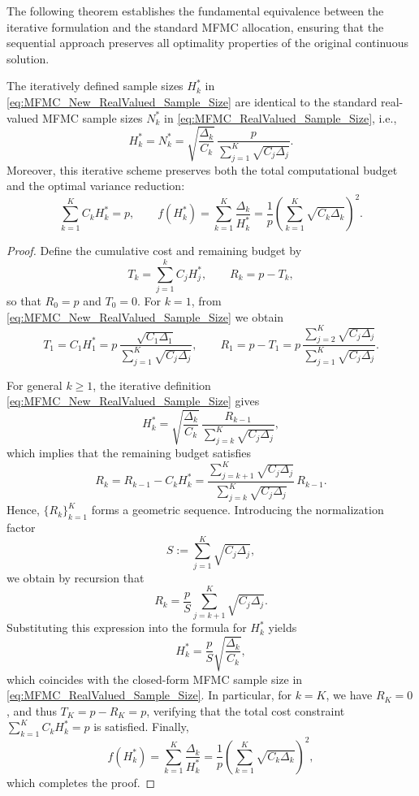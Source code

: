 The following theorem establishes the fundamental equivalence between the iterative formulation and the standard MFMC allocation, ensuring that the sequential approach preserves all optimality properties of the original continuous solution.

%
\begin{theorem}\label{thm:MFMC_Iterative_RealValued_Sample_Size}
The iteratively defined sample sizes $H_k^*$ in \eqref{eq:MFMC_New_RealValued_Sample_Size} are identical to the standard real-valued MFMC sample sizes $N_k^*$ in \eqref{eq:MFMC_RealValued_Sample_Size}, i.e.,
\[
H_k^* = N_k^*
    = \sqrt{\frac{\Delta_k}{C_k}}\,
      \frac{p}{\sum_{j=1}^K \sqrt{C_j\Delta_j}}.
\]
Moreover, this iterative scheme preserves both the total computational budget and the optimal variance reduction:
\[
\sum_{k=1}^K C_k H_k^* = p, 
\qquad  
f(H_k^*) = \sum_{k=1}^K \frac{\Delta_k}{H_k^*} = \frac{1}{p} \left(\sum_{k=1}^K \sqrt{C_k\Delta_k}\right)^2.
\]
\end{theorem}
%


\begin{proof}
Define the cumulative cost and remaining budget by
\[
    T_k = \sum_{j=1}^k C_j H_j^*, 
    \qquad 
    R_k = p - T_k,
\]
so that $R_0 = p$ and $T_0 = 0$. For $k=1$, from \eqref{eq:MFMC_New_RealValued_Sample_Size} we obtain
\[
    T_1 = C_1H_1^* 
    = p\,\frac{\sqrt{C_1\Delta_1}}{\sum_{j=1}^K \sqrt{C_j\Delta_j}},
    \qquad
    R_1 = p - T_1
    = p\,\frac{\sum_{j=2}^K \sqrt{C_j\Delta_j}}{\sum_{j=1}^K \sqrt{C_j\Delta_j}}.
\]

For general $k\ge 1$, the iterative definition \eqref{eq:MFMC_New_RealValued_Sample_Size} gives
\[
    H_k^*
    = \sqrt{\frac{\Delta_k}{C_k}}\,
      \frac{R_{k-1}}{\sum_{j=k}^K \sqrt{C_j \Delta_j}},
\]
which implies that the remaining budget satisfies
\[
    R_k 
    = R_{k-1} - C_k H_k^*
    = \frac{\sum_{j=k+1}^K \sqrt{C_j \Delta_j}}
           {\sum_{j=k}^K \sqrt{C_j \Delta_j}} \, R_{k-1}.
\]
Hence, $\{R_k\}_{k=1}^K$ forms a geometric sequence. Introducing the normalization factor
\begin{equation}\label{eq:aggregate_cost_variance_weight_S}
    S := \sum_{j=1}^K \sqrt{C_j \Delta_j},
\end{equation}
we obtain by recursion that
\[
    R_k = \frac{p}{S}\sum_{j=k+1}^K\sqrt{C_j\Delta_j}.
\]
Substituting this expression into the formula for $H_k^*$ yields
\[
    H_k^*
    = \frac{p}{S}\sqrt{\frac{\Delta_k}{C_k}},
\]
which coincides with the closed-form MFMC sample size in \eqref{eq:MFMC_RealValued_Sample_Size}.  
In particular, for $k=K$, we have $R_K=0$, and thus $T_K = p - R_K = p$, verifying that the total cost constraint $\sum_{k=1}^K C_k H_k^* = p$ is satisfied.  
Finally,
\[
    f(H_k^*)
    = \sum_{k=1}^K \frac{\Delta_k}{H_k^*}
    = \frac{1}{p} \left(\sum_{k=1}^K \sqrt{C_k\Delta_k}\right)^2,
\]
which completes the proof.
\end{proof}


